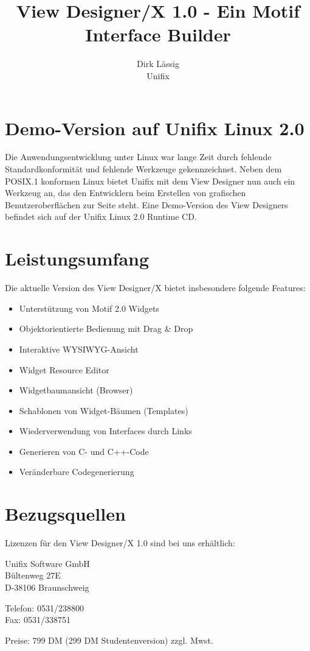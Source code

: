
\title{
	View Designer/X 1.0 - Ein Motif Interface Builder
}

\author{
	Dirk L\"assig\\
	Unifix
}



\maketitle

\section{Demo-Version auf Unifix Linux 2.0}

\thispagestyle{empty}

	Die Anwendungsentwicklung unter Linux war lange Zeit durch
	fehlende Standardkonformit\"at und fehlende Werkzeuge
	gekennzeichnet. Neben dem POSIX.1 konformen Linux bietet
	Unifix mit dem View Designer 
	nun auch ein Werkzeug an, das den Entwicklern
	beim Erstellen von grafischen Benut\-zer\-oberfl\"achen zur Seite
	steht. Eine Demo-Version des View Designers befindet sich auf
	der Unifix Linux 2.0 Runtime CD. 

\section{Leistungsumfang}

	Die aktuelle Version des View Designer/X bietet
        insbesondere folgende Features:

	\begin{itemize}

	\item   Unterst\"utzung von Motif 2.0 Widgets
	\item	Objektorientierte Bedienung mit Drag \& Drop
	\item 	Interaktive WYSIWYG-Ansicht
	\item 	Widget Resource Editor
	\item 	Widgetbaumansicht (Browser)
	\item	Schablonen von Widget-B\"aumen (Templates) 
	\item	Wiederverwendung von Interfaces durch Links
	\item 	Generieren von C- und C++-Code
	\item	Ver\"anderbare Codegenerierung

	\end{itemize}

\section{Bezugsquellen}

Lizenzen f\"ur den View Designer/X 1.0 sind bei uns erh\"altlich:

Unifix Software GmbH\\
B\"ultenweg 27E\\
D-38106 Braunschweig

Telefon: 0531/238800\\
Fax:  0531/338751

Preise: 799 DM (299 DM Studentenversion) zzgl. Mwst.

\makeauthor



